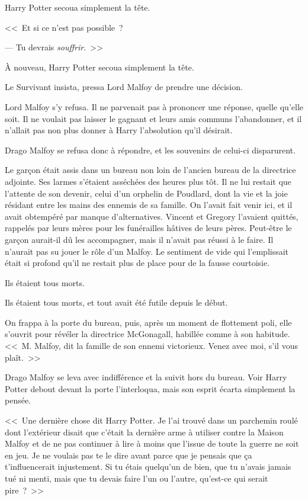 Harry Potter secoua simplement la tête.

<<~Et si ce n'est pas possible~?

--- Tu devrais \emph{souffrir}.~>>

À nouveau, Harry Potter secoua simplement la tête.

Le Survivant insista, pressa Lord Malfoy de prendre une décision.

Lord Malfoy s'y refusa. Il ne parvenait pas à prononcer une réponse, quelle qu'elle soit. Il ne voulait pas laisser le gagnant et leurs amis communs l'abandonner, et il n'allait pas non plus donner à Harry l'absolution qu'il désirait.

Drago Malfoy se refusa donc à répondre, et les souvenirs de celui-ci disparurent.

\later

Le garçon était assis dans un bureau non loin de l'ancien bureau de la directrice adjointe. Ses larmes s'étaient asséchées des heures plus tôt. Il ne lui restait que l'attente de son devenir, celui d'un orphelin de Poudlard, dont la vie et la joie résidant entre les mains des ennemis de sa famille. On l'avait fait venir ici, et il avait obtempéré par manque d'alternatives. Vincent et Gregory l'avaient quittés, rappelés par leurs mères pour les funérailles hâtives de leurs pères. Peut-être le garçon aurait-il dû les accompagner, mais il n'avait pas réussi à le faire. Il n'aurait pas su jouer le rôle d'un Malfoy. Le sentiment de vide qui l'emplissait était si profond qu'il ne restait plus de place pour de la fausse courtoisie.

Ils étaient tous morts.

Ils étaient tous morts, et tout avait été futile depuis le début.

On frappa à la porte du bureau, puis, après un moment de flottement poli, elle s'ouvrit pour révéler la directrice McGonagall, habillée comme à son habitude. <<~M. Malfoy, dit la famille de son ennemi victorieux. Venez avec moi, s'il vous plaît.~>>

Drago Malfoy se leva avec indifférence et la suivit hors du bureau. Voir Harry Potter debout devant la porte l'interloqua, mais son esprit écarta simplement la pensée.

<<~Une dernière chose dit Harry Potter. Je l'ai trouvé dans un parchemin roulé dont l'extérieur disait que c'était la dernière arme à utiliser contre la Maison Malfoy et de ne pas continuer à lire à moins que l'issue de toute la guerre ne soit en jeu. Je ne voulais pas te le dire avant parce que je pensais que ça t'influencerait injustement. Si tu étais quelqu'un de bien, que tu n'avais jamais tué ni menti, mais que tu devais faire l'un ou l'autre, qu'est-ce qui serait pire~?~>>

